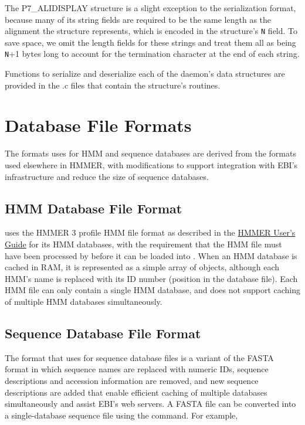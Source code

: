 \documentclass[notoc,justified]{tufte-book}    %
\begin{document}
The {P7\_ALIDISPLAY} structure is a slight exception to the serialization format, because many of its string fields are required to be the same length as the alignment the structure represents, which is encoded in the structure's {\tt N} field.  To save space, we omit the length fields for these strings and treat them all as being {\tt N}+1 bytes long to account for the termination character at the end of each string.

Functions to serialize and deserialize each of the daemon's data structures are provided in the .c files that contain the structure's routines.     

\chapter{Database File Formats}
The formats  uses for HMM and sequence databases are derived from the formats used elsewhere in HMMER, with modifications to support integration with EBI's infrastructure and reduce the size of sequence databases.

\section{HMM Database File Format}
 uses the HMMER 3 profile HMM file format as described in the \underline{HMMER User's Guide} for its HMM databases, with the requirement that the HMM file must have been processed by  before it can be loaded into .  When an HMM database is cached in RAM, it is represented as a simple array of  objects, although each HMM's name is replaced with its ID number (position in the database file).  Each HMM file can only contain a single HMM database, and  does not support caching of multiple HMM databases simultaneously.

\section{Sequence Database File Format}
The  format that  uses for sequence database files is a variant of the FASTA format in which sequence names are replaced with numeric IDs, sequence descriptions and accession information are removed, and new sequence descriptions are added that enable efficient caching of multiple databases simultaneously and assist EBI's web servers.  
A FASTA file can be converted into a single-database  sequence file using the  command.  For example, 
\end{document}
